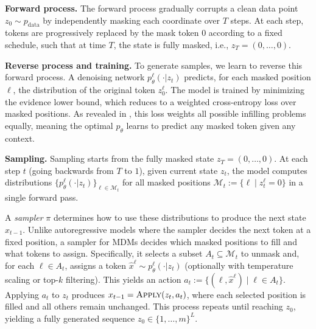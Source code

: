 \textbf{Forward process.}
The forward process gradually corrupts a clean data point $z_0 \sim p_{\text{data}}$ by independently masking each coordinate over $T$ steps. At each step, tokens are progressively replaced by the mask token $0$ according to a fixed schedule, such that at time $T$, the state is fully masked, i.e., $z_T = (0,\ldots,0)$.

\textbf{Reverse process and training.}
To generate samples, we learn to reverse this forward process. A denoising network $p_\theta^\ell(\cdot|z_t)$ predicts, for each masked position $\ell$, the distribution of the original token $z_0^\ell$. The model is trained by minimizing the evidence lower bound, which reduces to a weighted cross-entropy loss over masked positions. As revealed in \cite{kim2025train}, this loss weights all possible infilling problems equally, meaning the optimal $p_\theta$ learns to predict any masked token given any context.

\textbf{Sampling.}
Sampling starts from the fully masked state $z_T = (0,\ldots,0)$. At each step $t$ (going backwards from $T$ to $1$), given current state $z_t$, the model computes distributions $\{p_\theta^\ell(\cdot|z_t)\}_{\ell\in\mathcal{M}_t}$ for all masked positions $\mathcal{M}_t:=\{\ell\mid z_t^\ell=0\}$ in a single forward pass.

A \textit{sampler} $\pi$ determines how to use these distributions to produce the next state $x_{t-1}$. Unlike autoregressive models where the sampler decides the next token at a fixed position, a sampler for MDMs decides which masked positions to fill and what tokens to assign. Specifically, it selects a subset $A_t\subseteq\mathcal{M}_t$ to unmask and, for each $\ell\in A_t$, assigns a token $\hat{x}^\ell\sim p_\theta^\ell(\cdot|z_t)$ (optionally with temperature scaling or top-$k$ filtering). This yields an action $a_t:=\{(\ell,\hat{x}^\ell)\mid\ell\in A_t\}$. Applying $a_t$ to $z_t$ produces $x_{t-1}=\textsc{Apply}(z_t,a_t)$, where each selected position is filled and all others remain unchanged. This process repeats until reaching $z_0$, yielding a fully generated sequence $z_0\in\{1,\ldots,m\}^L$.

